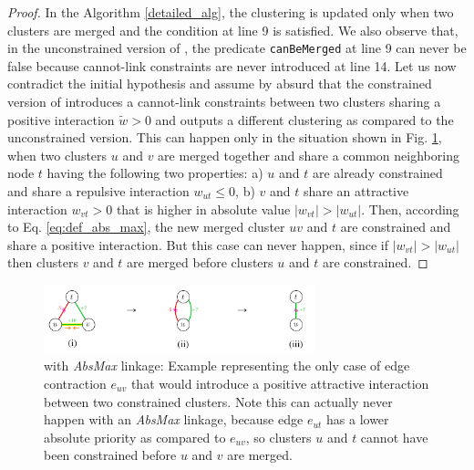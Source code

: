 \begin{proof}
In the \algname{} Algorithm \ref{detailed_alg}, the clustering is updated only when two clusters are merged and the condition at line 9 is satisfied. 
We also observe that, in the unconstrained version of \algname{}, the predicate \texttt{canBeMerged} at line 9 can never be false because cannot-link constraints are never introduced at line 14.
Let us now contradict the initial hypothesis and assume by absurd that the constrained version of \algname{} introduces a cannot-link constraints between two clusters sharing a positive interaction $\tilde{w}>0$ and outputs a different clustering as compared to the unconstrained version. 
This can happen only in the situation shown in Fig. \ref{fig:abs_max_proof_example}, when two clusters $u$ and $v$ are merged together and share a common neighboring node $t$ having the following two properties: a) $u$ and $t$ are already constrained and share a repulsive interaction $w_{ut}\leq0$, b) $v$ and $t$ share an attractive interaction $w_{vt}>0$ that is higher in absolute value $|w_{vt}|>|w_{ut}|$. 
Then, according to Eq. \ref{eq:def_abs_max}, the new merged cluster $uv$ and $t$ are constrained and share a positive interaction. 
But this case can never happen, since if $|w_{vt}|>|w_{ut}|$ then clusters $v$ and $t$ are merged before clusters $u$ and $t$ are constrained.  
\end{proof}


\begin{figure}
        \centering

        \includegraphics[width=0.7\textwidth]{./figs/proof_abs_max_example.pdf} %
\caption{\algname{} with \emph{AbsMax} linkage: Example representing the only case of edge contraction $e_{uv}$ that would introduce a positive attractive interaction between two constrained clusters. Note this can actually never happen with an \emph{AbsMax} linkage, because edge $e_{ut}$ has a lower absolute priority as compared to $e_{uv}$, so clusters $u$ and $t$ cannot have been constrained before $u$ and $v$ are merged.
}
\label{fig:abs_max_proof_example}  
\end{figure}




